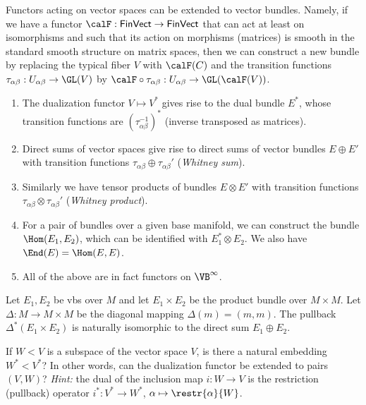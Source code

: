 \begin{defn}\label{functors VB}
    Functors acting on vector spaces can be extended to vector bundles. Namely, if we have a functor $\calF :\mathsf{FinVect}\to\mathsf{FinVect}$ that can act at least on isomorphisms and such that its action on morphisms (matrices) is smooth in the standard smooth structure on matrix spaces, then we can construct a new bundle by replacing the typical fiber $V$ with $\calF(C)$ and the transition functions $\tau_{\alpha\beta}:U_{\alpha\beta}\to \GL(V)$ by $\calF\circ \tau_{\alpha\beta}:U_{\alpha\beta}\to \GL(\calF (V))$.
    \begin{enumerate}
        \item The dualization functor $V\mapsto V^\ast$ gives rise to the dual bundle $E^\ast$, whose transition functions are $(\tau_{\alpha\beta}^{-1})^\ast$ (inverse transposed as matrices).
        \item Direct sums of vector spaces give rise to direct sums of vector bundles $E\oplus E'$ with transition functions $\tau_{\alpha\beta}\oplus \tau_{\alpha\beta}'$ (\emph{Whitney sum}).
        \item Similarly we have tensor products of bundles $E\otimes E'$ with transition functions $\tau_{\alpha\beta}\otimes \tau_{\alpha\beta}'$ (\emph{Whitney product}).
        \item For a pair of bundles over a given base manifold, we can construct the bundle $\Hom(E_1,E_2)$, which can be identified with $E_1^\ast\otimes E_2$. We also have $\End(E)=\Hom(E,E)$.
        \item All of the above are in fact functors on $\VB^\infty$.
    \end{enumerate}
\end{defn}


\begin{example}
    Let $E_1,E_2$ be \glspl{vb} over $M$ and let $E_1\times E_2$ be the product bundle over $M\times M$. Let $\Delta:M\to M\times M$ be the diagonal mapping $\Delta(m)=(m,m)$. The pullback $\Delta^\ast(E_1\times E_2)$ is naturally isomorphic to the direct sum $E_1\oplus E_2$.
\end{example}

\begin{xca}
    If $W<V$ is a subspace of the vector space $V$, is there a natural embedding $W^\ast<V^\ast$? In other words, can the dualization functor be extended to pairs $(V,W)$? \emph{Hint:} the dual of the inclusion map $i:W\to V$ is the restriction (pullback) operator $i^\ast:V^\ast\to W^\ast$, $\alpha\mapsto \restr{\alpha}{W}$.
\end{xca}

